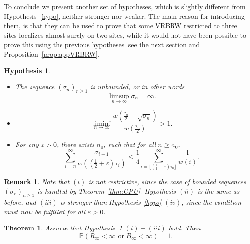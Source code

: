 \documentclass[10pt,a4paper]{amsart}
\newtheorem {theo} {Theorem} [section]
\newtheorem {rem} {Remark} [section]
\newtheorem {Hypo} {Hypothesis} [section]
\newcommand{\1}{{\text{\Large $\mathfrak 1$}}}
\begin{document}
To conclude we present another set of hypotheses, which is slightly different from Hypothesis~\ref{hypo}, neither stronger nor weaker. The main reason for introducing them, is that they can be used to prove that some VRBRW restricted to three sites localizes almost surely on two sites, while it would not have been possible to prove this using the previous hypotheses; see the next section and Proposition~\ref{prop:appVRBRW}.  

\begin{Hypo}\label{hypo2}
\begin{itemize}
\item[$(i)$] The sequence $(\sigma_n)_{n\ge 1}$ is unbounded, or in other words  
$$\limsup_{n\to \infty} \sigma_n = \infty. $$  
\item[$(ii)$] $$\liminf_{n\to \infty} \frac{w( \frac{\tau_n}{2} + \sqrt{\sigma_n})}{w(\frac{\tau_n}{2})} >1. $$ 
\item[$(iii)$]  For any $\varepsilon>0$, there exists $n_0$, such that for all $n\ge n_0$,  
$$\sum_{i=n}^\infty \frac{\sigma_{i+1}}{w((\frac 12 +\varepsilon)\tau_i)} \le \frac 14 \sum_{i = \lfloor (\frac 12 - \varepsilon) \tau_n\rfloor }^\infty \frac 1{w(i)}. $$ 
\end{itemize}
\end{Hypo}
\begin{rem}\emph{
Note that $(i)$ is not restrictive, since the case of bounded sequences $(\sigma_n)_{n\ge 1}$ is handled by Theorem~\ref{thm:GPU}. Hypothesis $(ii)$ is the same as before, and $(iii)$ is stronger than Hypothesis~\ref{hypo} $(iv)$, since the condition must now be fulfilled for all $\varepsilon>0$. }
\end{rem}
\begin{theo}\label{thm.loc.bis}
Assume that Hypothesis~\ref{hypo2} $(i)-(iii)$ hold. Then 
$$\mathbb P(R_\infty<\infty \text{ or } B_\infty<\infty)= 1. $$ 
\end{theo}
\end{document}
